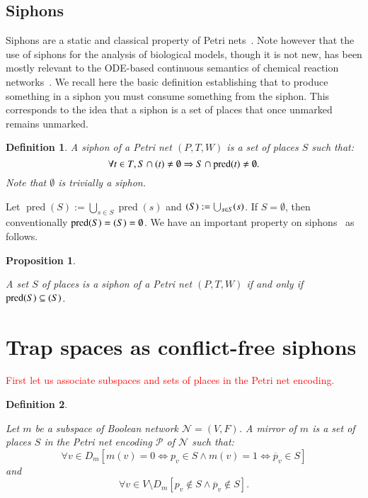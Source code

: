 \documentclass[preprint,12pt]{elsarticle}
\newtheorem{definition}{Definition}[section]
\newtheorem{proposition}{Proposition}[section]
\newcommand{\change}[1]{\textcolor{red}{#1}}
\DeclareMathOperator{\pred}{pred}
\let\succ\relax
\DeclareMathOperator{\succ}{succ}
\begin{document}
\subsection{Siphons}

Siphons are a static and classical property of Petri nets~\cite{peterson1981petri}.
Note however that the use of siphons for the analysis of biological models, though it is not new, has been mostly relevant to the ODE-based continuous semantics of chemical reaction networks~\cite{angeli2007petri,angeli2011persistence,degrand2020graphical}.
We recall here the basic definition establishing that to produce something in a siphon you must consume something from the siphon.
This corresponds to the idea that a siphon is a set of places that once unmarked remains unmarked.

\begin{definition}

  A \emph{siphon} of a Petri net \((P, T, W)\) is a set of places \(S\) such that:
  \[\forall t\in T, S\cap \succ(t)\not =\emptyset\Rightarrow S\cap \pred(t)\not =\emptyset.\]
  Note that \(\emptyset\) is trivially a siphon.

\end{definition}

Let \(\pred(S) := \bigcup_{s \in S}\pred(s)\) and \(\succ(S) := \bigcup_{s \in S}\succ(s)\).
If \(S = \emptyset\), then conventionally \(\pred(S) = \succ(S) = \emptyset\).
We have an important property on siphons~\cite{DBLP:journals/isci/LiuB16} as follows.

\begin{proposition}%
\label{prop:siphon_set}

  A set \(S\) of places is a siphon of a Petri net \((P, T, W)\) if and only if \(\pred(S) \subseteq \succ(S)\).

\end{proposition}


\section{Trap spaces as conflict-free siphons}%
\label{sec:Main_finding}

\change{First let us associate subspaces and sets of places in the Petri net encoding.}
\begin{definition}\label{def:mirror}

  Let \(m\) be a subspace of Boolean network \(\mathcal{N} = (V, F)\).
  A \emph{mirror} of \(m\) is a set of places \(S\) in the Petri net encoding \(\mathcal{P}\) of \(\mathcal{N}\) such that:
  \[\forall v \in D_m \left[m(v) = 0 \Leftrightarrow p_v \in S \land m(v) = 1 \Leftrightarrow \overline{p}_v \in S\right]\] and \[\forall v \in V \setminus D_m \left[p_v \not \in S \land \overline{p}_v \not \in S\right].\]

\end{definition}
\end{document}
